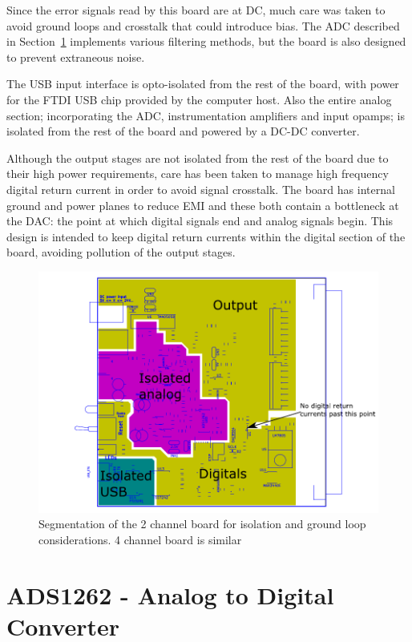 \documentclass[11pt]{report}
\begin{document}
Since the error signals read by this board are at DC, much care was taken to avoid ground loops and crosstalk that could introduce bias. The ADC described in Section~\ref{sub:ads1262_analog_to_digital_converter} implements various filtering methods, but the board is also designed to prevent extraneous noise. 

The USB input interface is opto-isolated from the rest of the board, with power for the FTDI USB chip provided by the computer host. Also the entire analog section; incorporating the ADC, instrumentation amplifiers and input opamps; is isolated from the rest of the board and powered by a DC-DC converter. 

Although the output stages are not isolated from the rest of the board due to their high power requirements, care has been taken to manage high frequency digital return current in order to avoid signal crosstalk. The board has internal ground and power planes to reduce EMI and these both contain a bottleneck at the DAC: the point at which digital signals end and analog signals begin. This design is intended to keep digital return currents within the digital section of the board, avoiding pollution of the output stages. 

\begin{figure}[h!]
	\centering
	\includegraphics[width=\textwidth]{BoardIsolation/BoardIsolation}
	\caption{Segmentation of the 2 channel board for isolation and ground loop considerations. 4 channel board is similar}
	\label{fig:isolation}
\end{figure}

\section{ADS1262 - Analog to Digital Converter} %
\label{sub:ads1262_analog_to_digital_converter}
\end{document}
